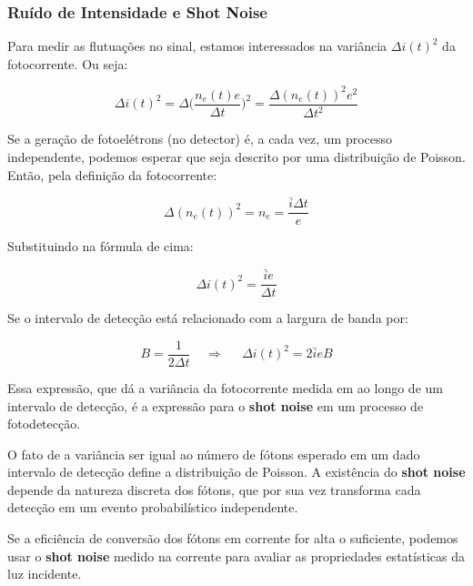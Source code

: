 
\subsubsection{Ruído de Intensidade e Shot Noise}

Para medir as flutuações no sinal, estamos interessados na variância $\Delta i(t)^2$ da fotocorrente. Ou seja:

\begin{equation}
    \Delta i(t)^2=\Delta \Bigg( \frac{n_e(t)e}{\Delta t} \Bigg)^2=\frac{\Delta (n_e(t))^2 e^2}{\Delta t^2}
\end{equation}

Se a geração de fotoelétrons (no detector) é, a cada vez, um processo independente, podemos esperar que seja descrito por uma distribuição de Poisson. Então, pela definição da fotocorrente:

\begin{equation}
    \Delta(n_e(t))^2=n_e=\frac{\bar{i}\Delta t}{e}
\end{equation}

Substituindo na fórmula de cima:

\begin{equation}
    \Delta i(t)^2=\frac{\bar{i}e}{\Delta t}
\end{equation}

Se o intervalo de detecção está relacionado com a largura de banda por:

\begin{equation}
    B=\frac{1}{2\Delta t}\;\;\;\;\Rightarrow\;\;\;\;\;\boxed{\Delta i(t)^2=2\bar{i}eB}
\end{equation}

Essa expressão, que dá a variância da fotocorrente medida em ao longo de um intervalo de detecção, é a expressão para o \textbf{shot noise} em um processo de fotodetecção.

O fato de a variância ser igual ao número de fótons esperado em um dado intervalo de detecção define a distribuição de Poisson. A existência do \textbf{shot noise} depende da natureza discreta dos fótons, que por sua vez transforma cada detecção em um evento probabilístico independente.

Se a eficiência de conversão dos fótons em corrente for alta o suficiente, podemos usar o \textbf{shot noise} medido na corrente para avaliar as propriedades estatísticas da luz incidente.

